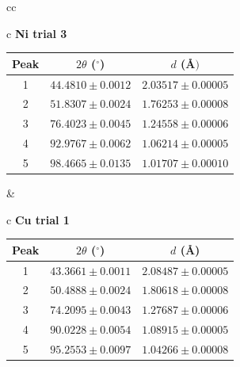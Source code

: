 \documentclass[12pt]{article}
\begin{document}
\begin{table}[H]
\begin{tabular}{cc}
\begin{tabular}{c}
\textbf{Ni trial 3}\\[-2pt]
\begin{tabular}{ccc}
\hline
Peak & $2\theta$ ($^\circ$) & $d$ (\AA$)$\\
\hline
1 & $44.4810 \pm 0.0012$ & $2.03517 \pm 0.00005$\\
2 & $51.8307 \pm 0.0024$ & $1.76253 \pm 0.00008$\\
3 & $76.4023 \pm 0.0045$ & $1.24558 \pm 0.00006$\\
4 & $92.9767 \pm 0.0062$ & $1.06214 \pm 0.00005$\\
5 & $98.4665 \pm 0.0135$ & $1.01707 \pm 0.00010$\\
\hline
\end{tabular}
\end{tabular}
&
\begin{tabular}{c}
\textbf{Cu trial 1}\\[-2pt]
\begin{tabular}{ccc}
\hline
Peak & $2\theta$ ($^\circ$) & $d$ (\AA)\\
\hline
1 & $43.3661 \pm 0.0011$ & $2.08487 \pm 0.00005$\\
2 & $50.4888 \pm 0.0024$ & $1.80618 \pm 0.00008$\\
3 & $74.2095 \pm 0.0043$ & $1.27687 \pm 0.00006$\\
4 & $90.0228 \pm 0.0054$ & $1.08915 \pm 0.00005$\\
5 & $95.2553 \pm 0.0097$ & $1.04266 \pm 0.00008$\\
\hline
\end{tabular}
\end{tabular}
\\[8pt]


\end{tabular}
\end{table}
\end{document}
